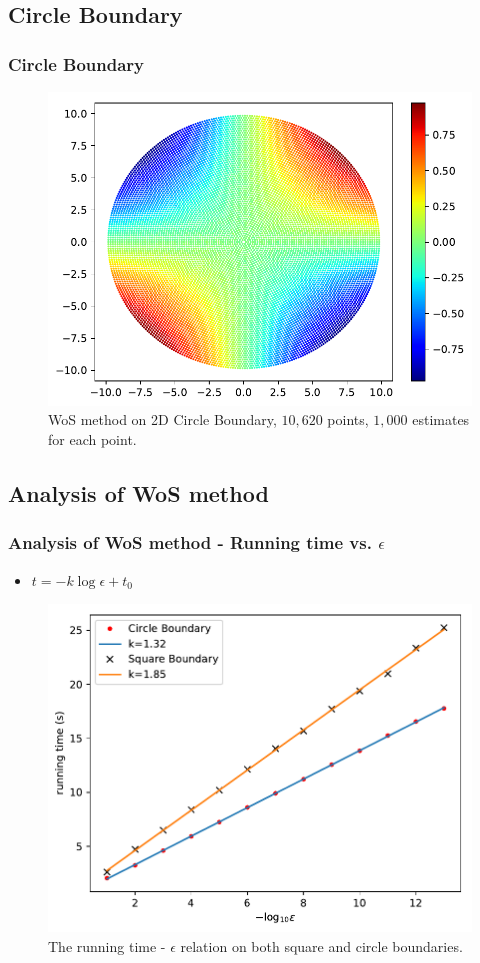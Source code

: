 \documentclass{beamer}
\begin{document}

\subsection{Circle Boundary}

\begin{frame}
\frametitle{Circle Boundary}
\begin{figure}[htbp]
    \centering
    \includegraphics[width=.75\textwidth]{./figs/wos_c}
    \caption{\label{fig:wos_c} WoS method on 2D Circle Boundary, $10,620$ points, $1,000$ estimates for each point.}
\end{figure}
\end{frame}


\subsection{Analysis of WoS method}

\begin{frame}
\frametitle{Analysis of WoS method - Running time vs. $\epsilon$}
\begin{itemize}
    \item $t = -k\log\epsilon + t_0$
\end{itemize}
\begin{figure}[htbp]
    \centering
    \includegraphics[width=.66\textwidth]{./figs/ep_t}
    \caption{\label{fig:ep_t} The running time - $\epsilon$ relation on both square and circle boundaries.}
\end{figure}
\end{frame}
\end{document}
